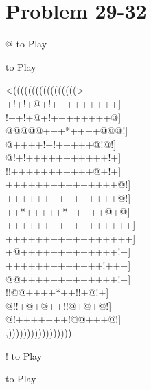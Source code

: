 \documentclass[mcrownvopaper,10pt,onecolumn,final]{memoir}
\begin{document}
\section{Problem 29-32}

\begin{minipage}[c]{0.5\linewidth}
\end{minipage}
\begin{minipage}[c]{0.5\linewidth}
\end{minipage}
\begin{minipage}[c]{0.5\linewidth}
    \hspace{8.3mm} {\gnos%
        @
    }
    to Play
\end{minipage}
\begin{minipage}[c]{0.5\linewidth}
    \hspace{27mm}{\gnos%
        !
    }
    to Play
\end{minipage}
\begin{minipage}[c]{\linewidth}
    \centering
    {\gnos%
          <(((((((((((((((((>\\
    +!+!+@+!+++++++++]\\
    !++!+@+!++++++++@]\\
    @@@@@+++*++++@@@!]\\
    @++++!+!+++++@!@!]\\
    @!+!+++++++++++!+]\\
    !!+++++++++++@+!+]\\
    +++++++++++++++@!]\\
    +++++++++++++++@!]\\
    ++*+++++*+++++@+@]\\
    +++++++++++++++++]\\
    +++++++++++++++++]\\
    +@+++++++++++++!+]\\
    +++++++++++++!+++]\\
    @@+++++++++++++!+]\\
    !!@@++++*++!!+@!+]\\
    @!!+@+@++!!@+@+@!]\\
    @!+++++++!@@+++@!]\\
          ,))))))))))))))))).\\
    }
\end{minipage}
\begin{minipage}[c]{0.5\linewidth}
    \hspace{8.3mm} {\gnos%
        !
    }
    to Play
\end{minipage}
\begin{minipage}[c]{0.5\linewidth}
    \hspace{27mm}{\gnos%
        @
    }
    to Play
\end{minipage}
\begin{minipage}[c]{0.5\linewidth}
\end{minipage}
\begin{minipage}[c]{0.5\linewidth}
\end{minipage}
\newpage
\end{document}
